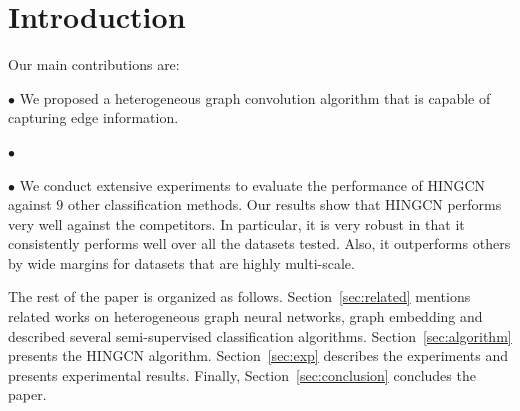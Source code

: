 \section{Introduction}
\label{sec:intro}


Our main contributions are:

\noindent$\bullet$
We proposed a heterogeneous graph convolution algorithm that is capable of capturing edge information.

\noindent$\bullet$

\noindent$\bullet$
We conduct extensive experiments %
to evaluate the performance of HINGCN
against $9$ other classification methods. 
Our results show that HINGCN performs very well against the competitors. 
In particular, it is very robust in that it consistently performs well over all the datasets tested. 
Also, it outperforms others by wide margins for datasets that are highly multi-scale. 

The rest of the paper is organized as follows.
Section~\ref{sec:related} mentions related works on heterogeneous graph neural networks, graph embedding and described several semi-supervised classification algorithms.
Section~\ref{sec:algorithm} presents the HINGCN algorithm.
Section~\ref{sec:exp} describes the experiments and presents experimental results.
Finally, Section~\ref{sec:conclusion} concludes the paper.



